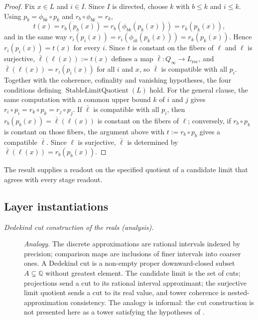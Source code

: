 \begin{proof}
Fix \(x\in L\) and \(i\in I\). Since \(I\) is directed, choose \(k\) with
\(b\le k\) and \(i\le k\). Using \(p_b=\phi_{bk}\circ p_k\) and
\(r_b\circ\phi_{bk}=r_k\),
\[
  t(x)=r_b(p_b(x))=r_b(\phi_{bk}(p_k(x)))=r_k(p_k(x)),
\]
and in the same way
\(r_i(p_i(x))=r_i(\phi_{ik}(p_k(x)))=r_k(p_k(x))\). Hence
\(r_i(p_i(x))=t(x)\) for every \(i\). Since \(t\) is constant on the fibers
of \(\ell\) and \(\ell\) is surjective, \(\bar\ell(\ell(x)):=t(x)\) defines a
map \(\bar\ell:Q_\infty\to L_{\mathrm{rec}}\), and
\(\bar\ell(\ell(x))=r_i(p_i(x))\) for all \(i\) and \(x\), so \(\bar\ell\) is
compatible with all \(p_i\). Together with the coherence, cofinality and
vanishing hypotheses, the four conditions defining
\(\operatorname{StableLimitQuotient}(L)\) hold.
For the general clause, the same computation with a common upper bound \(k\)
of \(i\) and \(j\) gives \(r_i\circ p_i=r_k\circ p_k=r_j\circ p_j\). If
\(\bar\ell\) is compatible with all \(p_i\), then
\(r_b(p_b(x))=\bar\ell(\ell(x))\) is constant on the fibers of \(\ell\);
conversely, if \(r_b\circ p_b\) is constant on those fibers, the argument above
with \(t:=r_b\circ p_b\) gives a compatible \(\bar\ell\). Since \(\ell\) is
surjective, \(\bar\ell\) is determined by \(\bar\ell(\ell(x))=r_b(p_b(x))\).
\end{proof}

The result supplies a readout on the specified quotient of a candidate limit
that agrees with every stage readout.

\subsection*{Layer instantiations}\label{layer-inst:F43}

\begingroup\small
\begin{description}
\item[\emph{Dedekind cut construction of the reals
(analysis).}] \textit{Analogy.}
The discrete approximations are rational intervals
indexed by precision; comparison maps are
inclusions of finer intervals into coarser ones.
A Dedekind cut is a non-empty proper downward-closed
subset \(A\subsetneq\mathbb Q\) without greatest element.  The candidate limit is the set of cuts;
projections send a cut to its rational interval
approximant; the surjective limit quotient sends
a cut to its real value, and tower coherence is
nested-approximation consistency.  The analogy
is informal: the cut construction is not
presented here as a tower satisfying the
hypotheses of  \citep{Dedekind1872Stetigkeit}.

\end{description}
\endgroup


